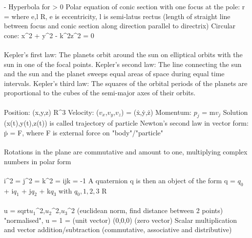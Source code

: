 \documentclass{article}
\begin{document}
- Hyperbola for \triangle > 0\)
\newline Polar equation of conic section with one focus at the pole: \math r = \) where \math e,l \in R, e\) is eccentricity, \math l\) is semi-latus rectus (length of straight line between focus and conic section along direction parallel to directrix)
\newline Circular cone: \math x^2 + y^2 - k^2z^2 = 0\)
\\
\\
Kepler's first law: The planets orbit around the sun on elliptical orbits with the sun in one of the focal points.
\newline Kepler's second law: The line connecting the sun and the sun and the planet sweeps equal areas of space during equal time intervals.
\newline Kepler's third law: The squares of the orbital periods of the planets are proportional to the cubes of the semi-major axes of their orbits.
\\
\\
Position: \math (x,y,z) \in R^3\)
\newline Velocity: \math ($v_x$,$v_y$,$v_z$) = (\.{x},\.{y},\.{z})\)
\newline Momentum: \math $p_j$ = m$v_j$
\newline Solution \math (x(t),y(t),z(t))\) is called trajectory of particle
\newline Newton's second law in vector form: \.{p} = F\), where F is external force on "body"/"particle"
\\
\\
Rotations in the plane are commutative and amount to one, multiplying complex numbers in polar form
\\
\\
\math i^2 = j^2 = k^2 = ijk = -1 \)
\newline A quaternion q is then an object of the form \math q = $q_0$ + i$q_1$ + j$q_2$ + k$q_3$\) with \math $q_0,1,2,3$ \in R\)
\\
\\
\vert u \vert = sqrt{$u_1$^2,$u_2$^2,$u_3$^2}\) (euclidean norm, find distance between 2 points)
\newline "normalised", \vert u \vert = 1 = \) (unit vector)
\newline \math(0,0,0)\) (zero vector)
\newline Scalar multiplication and vector addition/subtraction (commutative, associative and distributive)
\\
\end{document}
